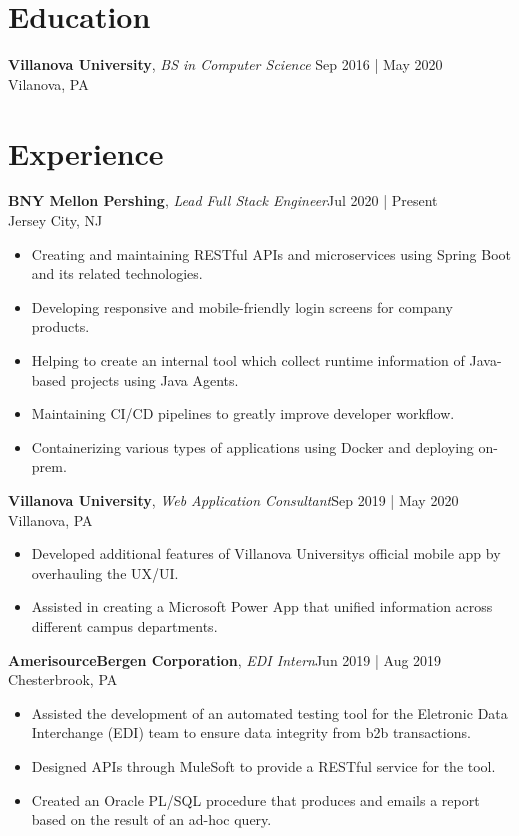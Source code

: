 \documentclass[line,margin]{res}
\begin{document}
\address{allen.gueco1@gmail.com | Philadelphia, PA}
\begin{resume}
	\vspace{-5mm}
	        
	
	\section{Education}
	\textbf{Villanova University}, {\sl BS in Computer Science} \hfill Sep 2016 | May 2020\\Vilanova, PA
	\section{Experience}
	\textbf{BNY Mellon \textbar{} Pershing}, {\sl Lead Full Stack Engineer}\hfill Jul 2020 | Present\\Jersey City, NJ\\\begin{itemize} \itemsep 3pt
	\item Creating and maintaining RESTful APIs and microservices using Spring Boot and its related technologies.
	\item Developing responsive and mobile-friendly login screens for company products.
	\item Helping to create an internal tool which collect runtime information of Java-based projects using Java Agents.
	\item Maintaining CI/CD pipelines to greatly improve developer workflow.
	\item Containerizing various types of applications using Docker and deploying on-prem.
	\end{itemize}
	\textbf{Villanova University}, {\sl Web Application Consultant}\hfill Sep 2019 | May 2020\\Villanova, PA\\\begin{itemize} \itemsep 3pt
	\item Developed additional features of Villanova University\textquotesingle{}s official mobile app by overhauling the UX/UI.
	\item Assisted in creating a Microsoft Power App that unified information across different campus departments.
	\end{itemize}
	\textbf{AmerisourceBergen Corporation}, {\sl EDI Intern}\hfill Jun 2019 | Aug 2019\\Chesterbrook, PA\\\begin{itemize} \itemsep 3pt
	\item Assisted the development of an automated testing tool for the Eletronic Data Interchange (EDI) team to ensure data integrity from b2b transactions.
	\item Designed APIs through MuleSoft to provide a RESTful service for the tool.
	\item Created an Oracle PL/SQL procedure that produces and emails a report based on the result of an ad-hoc query.
	\end{itemize}

\end{resume}
\end{document}
